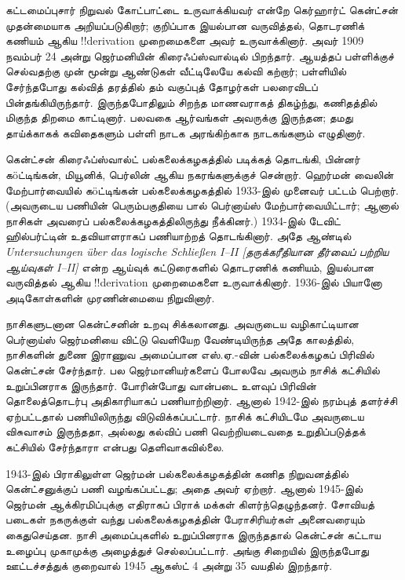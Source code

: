 \documentclass[../../../include/open-logic-section]{subfiles}
\begin{document}



கட்டமைப்புசார் நிறுவல் கோட்பாட்டை உருவாக்கியவர் என்றே கெர்ஹார்ட்
கென்ட்சன் முதன்மையாக அறியப்படுகிறார்; குறிப்பாக இயல்பான வருவித்தல்,
தொடரணிக் கணியம் ஆகிய !!{derivation} முறைமைகளை அவர் உருவாக்கினார்.
அவர் 1909 நவம்பர் 24 அன்று ஜெர்மனியின் கிரைஃப்ஸ்வால்டில் பிறந்தார்.
ஆயத்தப் பள்ளிக்குச் செல்வதற்கு முன் மூன்று ஆண்டுகள் வீட்டிலேயே கல்வி
கற்றார்; பள்ளியில் சேர்ந்தபோது கல்வித் தரத்தில் தம் வகுப்புத் தோழர்கள்
பலரைவிடப் பின்தங்கியிருந்தார். இருந்தபோதிலும் சிறந்த மாணவராகத் திகழ்ந்து,
கணிதத்தில் மிகுந்த திறமை காட்டினார். பலவகை ஆர்வங்கள் அவருக்கு இருந்தன;
தமது தாய்க்காகக் கவிதைகளும் பள்ளி நாடக அரங்கிற்காக நாடகங்களும் எழுதினார்.

கென்ட்சன் கிரைஃப்ஸ்வால்ட் பல்கலைக்கழகத்தில் படிக்கத் தொடங்கி, பின்னர்
க\"{o}ட்டிங்கன், மியூனிக், பெர்லின் ஆகிய நகரங்களுக்குச் சென்றார். ஹெர்மன்
வைலின் மேற்பார்வையில் க\"{o}ட்டிங்கன் பல்கலைக்கழகத்தில் 1933-இல் முனைவர்
பட்டம் பெற்றார். (அவருடைய பணியின் பெரும்பகுதியை பால் பெர்னாய்ஸ்
மேற்பார்வையிட்டார்; ஆனால் நாசிகள் அவரைப் பல்கலைக்கழகத்திலிருந்து
நீக்கினர்.) 1934-இல் டேவிட் ஹில்பர்ட்டின் உதவியாளராகப் பணியாற்றத்
தொடங்கினார். அதே ஆண்டில் \emph{Untersuchungen \"{u}ber das logische
Schlie\ss en I--II [தருக்கரீதியான தீர்வைப் பற்றிய ஆய்வுகள் I--II]}
என்ற ஆய்வுக் கட்டுரைகளில் தொடரணிக் கணியம், இயல்பான வருவித்தல் ஆகிய
!!{derivation} முறைமைகளை உருவாக்கினார். 1936-இல் பியானோ
அடிகோள்களின் முரணின்மையை நிறுவினார்.

நாசிகளுடனான கென்ட்சனின் உறவு சிக்கலானது. அவருடைய வழிகாட்டியான பெர்னாய்ஸ்
ஜெர்மனியை விட்டு வெளியேற வேண்டியிருந்த அதே காலத்தில், நாசிகளின் துணை
இராணுவ அமைப்பான எஸ்.ஏ.-வின் பல்கலைக்கழகப் பிரிவில் கென்ட்சன் சேர்ந்தார்.
பல ஜெர்மானியர்களைப் போலவே அவரும் நாசிக் கட்சியில் உறுப்பினராக இருந்தார்.
போரின்போது வான்படை உளவுப் பிரிவின் தொலைத்தொடர்பு அதிகாரியாகப் பணியாற்றினார்.
ஆனால் 1942-இல் நரம்புத் தளர்ச்சி ஏற்பட்டதால் பணியிலிருந்து விடுவிக்கப்பட்டார்.
நாசிக் கட்சியிடமே அவருடைய விசுவாசம் இருந்ததா, அல்லது கல்விப் பணி
வெற்றியடைவதை உறுதிப்படுத்தக் கட்சியில் சேர்ந்தாரா என்பது தெளிவாகவில்லை.

1943-இல் பிராகிலுள்ள ஜெர்மன் பல்கலைக்கழகத்தின் கணித நிறுவனத்தில்
கென்ட்சனுக்குப் பணி வழங்கப்பட்டது; அதை அவர் ஏற்றார். ஆனால் 1945-இல்
ஜெர்மன் ஆக்கிரமிப்புக்கு எதிராகப் பிராக் மக்கள் கிளர்ந்தெழுந்தனர். சோவியத்
படைகள் நகருக்குள் வந்து பல்கலைக்கழகத்தின் பேராசிரியர்கள் அனைவரையும்
கைதுசெய்தன. நாசி அமைப்புகளில் உறுப்பினராக இருந்ததால் கென்ட்சன் கட்டாய
உழைப்பு முகாமுக்கு அழைத்துச் செல்லப்பட்டார். அங்கு சிறையில் இருந்தபோது
ஊட்டச்சத்துக் குறைவால் 1945 ஆகஸ்ட் 4 அன்று 35 வயதில் இறந்தார்.
\end{document}

